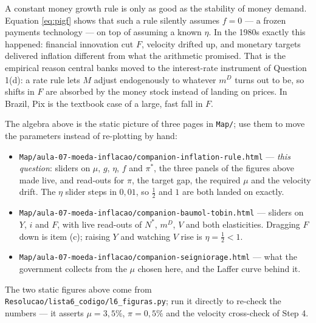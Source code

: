 \documentclass[11pt, a4paper]{article}
\newcommand{\md}{m^{D}}
\newcommand{\Nst}{N^{\ast}}
\begin{document}
\begin{tcolorbox}[theorybox, title={The policy moral, and why the constant-money-growth rule lost}]
\small
A constant money growth rule is only as good as the stability of money demand. Equation
\eqref{eq:pigf} shows that such a rule silently assumes $f=0$ --- a frozen payments technology
--- on top of assuming a known $\eta$. In the 1980s exactly this happened: financial
innovation cut $F$, velocity drifted up, and monetary targets delivered inflation different
from what the arithmetic promised. That is the empirical reason central banks moved to the
interest-rate instrument of Question 1(d): a rate rule lets $M$ adjust endogenously to
whatever $\md$ turns out to be, so shifts in $F$ are absorbed by the money stock instead of
landing on prices. In Brazil, Pix is the textbook case of a large, fast fall in $F$.
\end{tcolorbox}

\begin{tcolorbox}[planbox, title={Interactive companions (already in this project)}]
\small
The algebra above is the static picture of three pages in \texttt{Map/}; use them to move the
parameters instead of re-plotting by hand:
\begin{itemize}
\item \texttt{Map/aula-07-moeda-inflacao/companion-inflation-rule.html} --- \emph{this
      question}: sliders on $\mu$, $g$, $\eta$, $f$ and $\pi^{\ast}$, the three panels of the
      figures above made live, and read-outs for $\pi$, the target gap, the required $\mu$ and
      the velocity drift. The $\eta$ slider steps in $0{,}01$, so $\tfrac12$ and $1$ are both
      landed on exactly.
\item \texttt{Map/aula-07-moeda-inflacao/companion-baumol-tobin.html} --- sliders on $Y$, $i$
      and $F$, with live read-outs of $\Nst$, $\md$, $V$ and both elasticities. Dragging $F$
      down is item (c); raising $Y$ and watching $V$ rise is $\eta=\tfrac12<1$.
\item \texttt{Map/aula-07-moeda-inflacao/companion-seigniorage.html} --- what the government
      collects from the $\mu$ chosen here, and the Laffer curve behind it.
\end{itemize}
The two static figures above come from \texttt{Resolucao/lista6\_codigo/l6\_figuras.py}; run it
directly to re-check the numbers --- it asserts $\mu=3{,}5\%$, $\pi=0{,}5\%$ and the velocity
cross-check of Step 4.
\end{tcolorbox}
\end{document}
